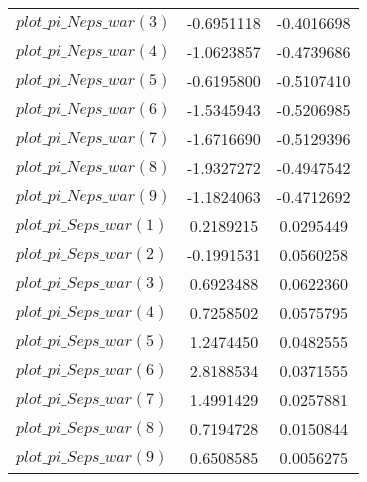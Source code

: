 \begin{center}
\begin{longtable}{lcc}
$plot\_pi\_N eps\_war (3)   $	 & 	     -0.6951118	 & 	     -0.4016698 \\ 
$plot\_pi\_N eps\_war (4)   $	 & 	     -1.0623857	 & 	     -0.4739686 \\ 
$plot\_pi\_N eps\_war (5)   $	 & 	     -0.6195800	 & 	     -0.5107410 \\ 
$plot\_pi\_N eps\_war (6)   $	 & 	     -1.5345943	 & 	     -0.5206985 \\ 
$plot\_pi\_N eps\_war (7)   $	 & 	     -1.6716690	 & 	     -0.5129396 \\ 
$plot\_pi\_N eps\_war (8)   $	 & 	     -1.9327272	 & 	     -0.4947542 \\ 
$plot\_pi\_N eps\_war (9)   $	 & 	     -1.1824063	 & 	     -0.4712692 \\ 
$plot\_pi\_S eps\_war (1)   $	 & 	      0.2189215	 & 	      0.0295449 \\ 
$plot\_pi\_S eps\_war (2)   $	 & 	     -0.1991531	 & 	      0.0560258 \\ 
$plot\_pi\_S eps\_war (3)   $	 & 	      0.6923488	 & 	      0.0622360 \\ 
$plot\_pi\_S eps\_war (4)   $	 & 	      0.7258502	 & 	      0.0575795 \\ 
$plot\_pi\_S eps\_war (5)   $	 & 	      1.2474450	 & 	      0.0482555 \\ 
$plot\_pi\_S eps\_war (6)   $	 & 	      2.8188534	 & 	      0.0371555 \\ 
$plot\_pi\_S eps\_war (7)   $	 & 	      1.4991429	 & 	      0.0257881 \\ 
$plot\_pi\_S eps\_war (8)   $	 & 	      0.7194728	 & 	      0.0150844 \\ 
$plot\_pi\_S eps\_war (9)   $	 & 	      0.6508585	 & 	      0.0056275 \\ 
\end{longtable}
 \end{center}
